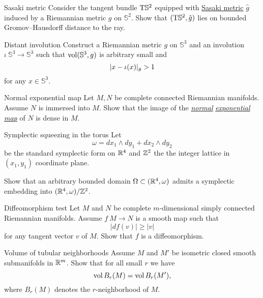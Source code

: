 \documentclass[twoside]{book}
\begin{document}
\begin{pr}{}{Sasaki metric}\label{pr:Sasaki metric}
Consider the tangent bundle $\mathrm{T} \mathbb{S}^2$ 
equipped with \hyperref[Sasaki metric]{Sasaki metric} $\hat g$ induced by a Riemannian metric $g$ on $\mathbb{S}^2$.
Show that $(\mathrm{T} \mathbb{S}^2, \hat g)$ lies on bounded Gromov--Hausdorff distance to the ray.
\end{pr}

\begin{pr}{}{Distant involution}\label{Distant involution}
Construct a Riemannian metric $g$ on $\mathbb{S}^3$ and an involution $\iota\:\mathbb{S}^3\to\mathbb{S}^3$ such that $\operatorname{\rm vol} (\mathbb{S}^3,g)$ is arbitrary small and 
\[|x\z-\iota(x)|_g>1\]
 for any $x\in\mathbb{S}^3$.
\end{pr}




\begin{pr}{\easy}{Normal exponential map}\label{Normal exponential map}
Let $M,N$ be complete connected Riemannian manifolds.
Assume $N$ is immersed into $M$.
Show that the image  of the 
\hyperref[Exponential map]{\emph{normal}} 
\hyperref[Exponential map]{\emph{exponential}} 
\hyperref[Exponential map]{\emph{map}} of $N$ is dense in $M$.
\end{pr}


\begin{pr}{}{Symplectic squeezing in the torus}\label{Symplectic squeezing in the torus}
Let 
\[\omega=dx_1\wedge dy_1+ dx_2\wedge dy_2\]
be the standard symplectic form on $\mathbb{R}^4$
and $\mathbb{Z}^2$ the the integer lattice in $(x_1,y_1)$ coordinate plane.

Show that an arbitrary bounded domain $\Omega\subset (\mathbb{R}^4,\omega)$
admits a symplectic embedding into $(\mathbb{R}^4,\omega)/\mathbb{Z}^2$. 
\end{pr}


\begin{pr}{\easy}{Diffeomorphism test}\label{Diffeomorphism test}
Let $M$ and $N$ be 
complete 
$m$-dimensional
simply connected 
Riemannian manifolds.
Assume $f\:M\to N$
is a smooth map such that 
$$|df(v)|\ge |v|$$
for any tangent vector $v$ of $M$.
Show that $f$ is a diffeomorphism.
\end{pr}

\begin{pr}{}{Volume of tubular neighborhoods}\label{Volume of tubular neighborhoods}
Assume $M$ and $M'$ be isometric closed smooth submanifolds in $\mathbb{R}^m$.
Show that for all small $r$ we have
$$\operatorname{\rm vol} B_r(M)=\operatorname{\rm vol} B_r(M'),$$
where $B_r(M)$ denotes the $r$-neighborhood of $M$.
\end{pr}
\end{document}
